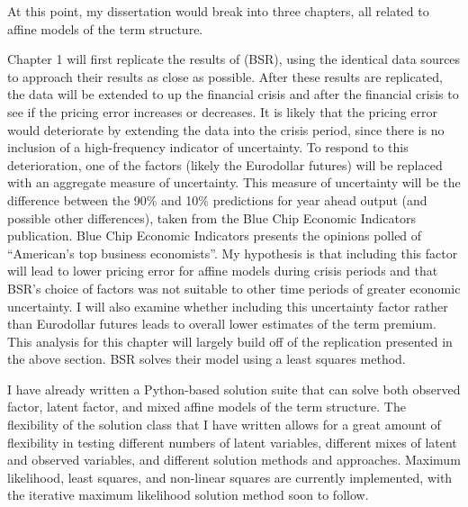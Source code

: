 \documentclass{article}
\numberwithin{equation}{section}
\begin{document}
At this point, my dissertation would break into three chapters, all related to
affine models of the term structure.

Chapter 1 will first replicate the results of \citet{sack2005monetary} (BSR),
using the identical data sources to approach their results as close as
possible. After these results are replicated, the data will be extended to up
the financial crisis and after the financial crisis to see if the pricing error
increases or decreases. It is likely that the pricing error would deteriorate
by extending the data into the crisis period, since there is no inclusion of
a high-frequency indicator of uncertainty. To respond to this deterioration,
one of the factors (likely the Eurodollar futures) will be replaced with an
aggregate measure of uncertainty. This measure of uncertainty will be the
difference between the 90\% and 10\% predictions for year ahead output (and
possible other differences), taken from the Blue Chip Economic Indicators
publication. Blue Chip Economic Indicators presents the opinions polled of
``American's top business economists''. My hypothesis is that including this
factor will lead to lower pricing error for affine models during crisis periods
and that BSR's choice of factors was not suitable to other time periods of
greater economic uncertainty. I will also examine whether including this
uncertainty factor rather than Eurodollar futures leads to overall lower
estimates of the term premium. This analysis for this chapter will largely
build off of the replication presented in the above section. BSR solves their
model using a least squares method.

I have already written a Python-based solution suite that can solve both
observed factor, latent factor, and mixed affine models of the term structure.
The flexibility of the solution class that I have written allows for a great
amount of flexibility in testing different numbers of latent variables,
different mixes of latent and observed variables, and different solution
methods and approaches. Maximum likelihood, least squares, and non-linear
squares are currently implemented, with the \citet{ang2003no} iterative maximum
likelihood solution method soon to follow.
\end{document}

